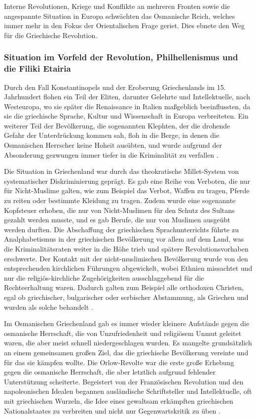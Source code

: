 \documentclass[preprint]{geomorphica} %
\begin{document}
Interne Revolutionen, Kriege und Konflikte an mehreren Fronten sowie die angespannte Situation in Europa schwächten das Osmanische Reich, welches immer mehr in den Fokus der Orientalischen Frage geriet.
Dies ebnete den Weg für die Griechische Revolution.  

\subsubsection{Situation im Vorfeld der Revolution, Philhellenismus und die Filiki Etairia}

Durch den Fall Konstantinopels und der Eroberung Griechenlands im 15. Jahrhundert flohen ein Teil der Eliten, darunter Gelehrte und Intellektuelle, nach Westeuropa, wo sie später die Renaissance in Italien maßgeblich beeinflussten, da sie die griechische Sprache, Kultur und Wissenschaft in Europa verbreiteten.
Ein weiterer Teil der Bevölkerung, die sogenannten Klephten, der die drohende Gefahr der Unterdrückung kommen sah, floh in die Berge, in denen die Osmanischen Herrscher keine Hoheit ausübten, und wurde aufgrund der Absonderung gezwungen immer tiefer in die Kriminalität zu verfallen \cite{Brewer2001, Clogg1979}.

Die Situation in Griechenland war durch das theokratische Millet-System von systematischer Diskriminierung geprägt.
Es gab eine Reihe von Verboten, die nur für Nicht-Muslime galten, wie zum Beispiel das Verbot, Waffen zu tragen, Pferde zu reiten oder bestimmte Kleidung zu tragen.
Zudem wurde eine sogenannte Kopfsteuer erhoben, die nur von Nicht-Muslimen für den Schutz des Sultans gezahlt werden musste, und es gab Berufe, die nur von Muslimen ausgeübt werden durften.
Die Abschaffung der griechischen Sprachunterrichts führte zu Analphabetismus in der griechischen Bevölkerung vor allem auf dem Land, was die Kriminalitätsraten weiter in die Höhe trieb und spätere Revolutionsvorhaben erschwerte. 
Der Kontakt mit der nicht-muslimischen Bevölkerung wurde von den entsprechenden kirchlichen Führungen abgewickelt, wobei Ethnien missachtet und nur die religiös-kirchliche Zugehörigkeiten ausschlaggebend für die Rechteerhaltung waren.
Dadurch galten zum Beispiel alle orthodoxen Christen, egal ob griechischer, bulgarischer oder serbischer Abstammung, als Griechen und wurden als solche behandelt \cite{Woodhouse1998, Sugar1977, Clogg1979}.

Im Osmanischen Griechenland gab es immer wieder kleinere Aufstände gegen die osmanische Herrschaft, die von Unzufriedenheit und religiösem Unmut geleitet waren, die aber meist schnell niedergeschlagen wurden.
Es mangelte grundsätzlich an einem gemeinsamen großen Ziel, das die griechische Bevölkerung vereinte und für das sie kämpfen wollte.
Die Orlow-Revolte war die erste große Erhebung gegen die osmanische Herrschaft, die aber letztlich aufgrund fehlender Unterstützung scheiterte.
Begeistert von der Französischen Revolution und den napoleonischen Idealen begannen ausländische Schriftsteller und Intellektuelle, oft mit griechischen Wurzeln, die Idee eines gewaltsam erkämpften griechischen Nationalstaates zu verbreiten und nicht nur Gegenwartskritik zu üben \cite{Zelepos2015, Brewer2001, Dakin1952}.
\end{document}
